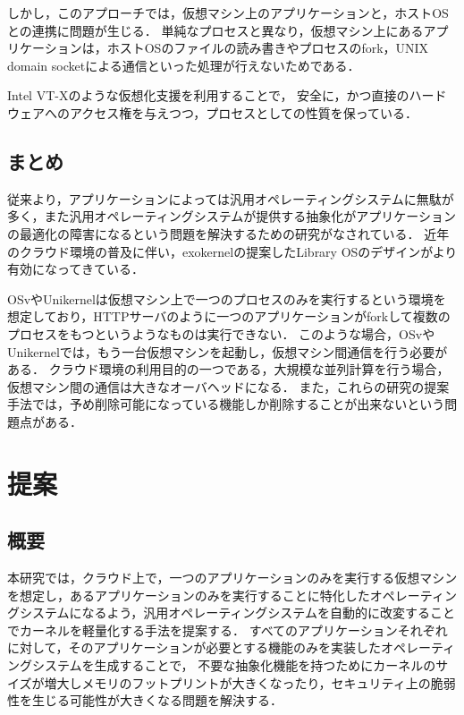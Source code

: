 \documentclass[graduation-thesis]{mlarticle}
\begin{document}
しかし，このアプローチでは，仮想マシン上のアプリケーションと，ホストOSとの連携に問題が生じる．
単純なプロセスと異なり，仮想マシン上にあるアプリケーションは，ホストOSのファイルの読み書きやプロセスのfork，UNIX domain socketによる通信といった処理が行えないためである．

Intel VT-Xのような仮想化支援を利用することで， 安全に，かつ直接のハードウェアへのアクセス権を与えつつ，プロセスとしての性質を保っている．


\subsection{まとめ}
\label{relative:conclusion}
従来より，アプリケーションによっては汎用オペレーティングシステムに無駄が多く，また汎用オペレーティングシステムが提供する抽象化がアプリケーションの最適化の障害になるという問題を解決するための研究がなされている．
近年のクラウド環境の普及に伴い，exokernelの提案したLibrary OSのデザインがより有効になってきている．

OSvやUnikernelは仮想マシン上で一つのプロセスのみを実行するという環境を想定しており，HTTPサーバのように一つのアプリケーションがforkして複数のプロセスをもつというようなものは実行できない．
このような場合，OSvやUnikernelでは，もう一台仮想マシンを起動し，仮想マシン間通信を行う必要がある．
クラウド環境の利用目的の一つである，大規模な並列計算を行う場合，仮想マシン間の通信は大きなオーバヘッドになる．
また，これらの研究の提案手法では，予め削除可能になっている機能しか削除することが出来ないという問題点がある．

\clearpage
\section{提案}
\label{proposal}

\subsection{概要}
\label{proposal:abstruction}
本研究では，クラウド上で，一つのアプリケーションのみを実行する仮想マシンを想定し，あるアプリケーションのみを実行することに特化したオペレーティングシステムになるよう，汎用オペレーティングシステムを自動的に改変することでカーネルを軽量化する手法を提案する．
すべてのアプリケーションそれぞれに対して，そのアプリケーションが必要とする機能のみを実装したオペレーティングシステムを生成することで，
不要な抽象化機能を持つためにカーネルのサイズが増大しメモリのフットプリントが大きくなったり，セキュリティ上の脆弱性を生じる可能性が大きくなる問題を解決する．
\end{document}
